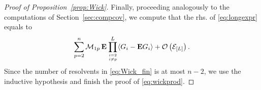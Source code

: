 \documentclass[10pt]{amsart}
\numberwithin{equation}{section}
\newcommand{\E}{\mathbf{E}}
\begin{document}
\begin{proof}[Proof of Proposition~\ref{prop:Wick}]
Finally, proceeding analogously to the computations of Section~\ref{sec:compcov}, we compute that the rhs. of \eqref{eq:longexpr} equals to
\begin{equation}
\sum_{p=2}^n \mathcal{M}_{1p}\,\E\prod_{i=2 \atop i\ne p}^L\langle G_i-\E G_i\rangle+\mathcal{O}\left(\mathcal{E}_{[L]}\right).
\label{eq:Wick_fin}
\end{equation}
Since the number of resolvents in \eqref{eq:Wick_fin} is at most $n-2$, we use the inductive hypothesis and finish the proof of \eqref{eq:wickprod}.
\end{proof}

 

\end{document}
